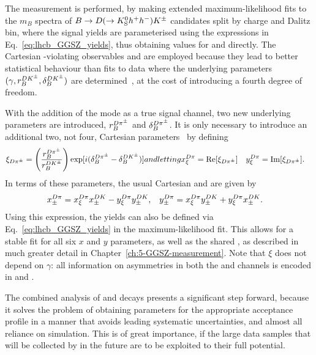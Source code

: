 The measurement is performed, by making extended maximum-likelihood fits to the $m_B$ spectra of ${B}\rightarrow{\ensuremath{D}}(\rightarrow{\ensuremath{{K}^0_{\mathrm{S}}}} h^+h^-){{K}^\pm}$ candidates split by charge and Dalitz bin, where the signal yields are parameterised using the expressions in Eq.~\eqref{eq:lhcb_GGSZ_yields}, thus obtaining values for \xpmdk and \ypmdk directly. 
The Cartesian \CP-violating observables \xpm and \ypm are employed because they lead to better statistical behaviour than fits to data where the underlying parameters $(\gamma, r_B^{{D}{{K}^\pm}}, \delta_B^{{D}{{K}^\pm}})$ are determined~\cite{}, at the cost of introducing a fourth degree of freedom. 

With the addition of the \BtoDpi mode as a true signal channel, two new underlying parameters are introduced, $r_B^{{{D}{{\pi}^\pm}}}$ and $\delta_B^{{{D}{{\pi}^\pm}}}$. It is only necessary to introduce an additional two, not four, Cartesian parameters~\cite{Tico:2018qmg} by defining
\begin{subequations}
\begin{align}
    \xi_{\DPi} = \left(\frac{r_B^{\DPi}}{r_B^{\DK}}\right)\exp [i (\delta_B^{\DPi}-\delta_B^{\DK})]
\end{align}
and letting
\begin{align}
    \xxidpi &= \Re [\xi_{\Dpi}] & \yxidpi &= \Im [\xi_{\Dpi}].
\end{align}
\end{subequations}
In terms of these parameters, the usual Cartesian \xpm and \ypm are given by
\begin{align}\label{eq:xy_from_xi}
    x_\pm^{{D}\pi} &= x_\xi^{{D}\pi}x_\pm^{DK} - y_\xi^{{D}\pi}y_\pm^{DK}, 
    & y_\pm^{{D}\pi} &= x_\xi^{{D}\pi}y_\pm^{DK} + y_\xi^{{D}\pi}x_\pm^{DK}.
\end{align} 
Using this expression, the \BtoDpi yields can also be defined via Eq.~\eqref{eq:lhcb_GGSZ_yields} in the maximum-likelihood fit. This allows for a stable fit for all six $x$ and $y$ parameters, as well as the shared \Fi, as described in much greater detail in Chapter~\ref{ch:5-GGSZ-measurement}. Note that $\xi$ does not depend on $\gamma$: all information on \CP asymmetries in both the \BtoDK and \BtoDpi channels is encoded in \xpmdk and \ypmdk. 

The combined analysis of \BtoDK and \BtoDpi decays presents a significant step forward, because it solves the problem of obtaining \Fi parameters for the appropriate acceptance profile in a manner that avoids leading systematic uncertainties, and almost all reliance on simulation. This is of great importance, if the large data samples that will be collected by \lhcb in the future are to be exploited to their full potential.






